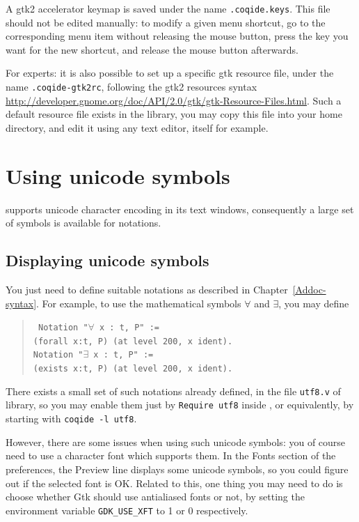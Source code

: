 A gtk2 accelerator keymap is saved under the name \verb|.coqide.keys|.
This file should not be edited manually: to modify a given menu
shortcut, go to the corresponding menu item without releasing the
mouse button, press the key you want for the new shortcut, and release
the mouse button afterwards.

For experts: it is also possible to set up a specific gtk resource
file, under the name \verb|.coqide-gtk2rc|, following the gtk2
resources syntax
\url{http://developer.gnome.org/doc/API/2.0/gtk/gtk-Resource-Files.html}.
Such a default resource file exists in the \Coq{} library, you may
copy this file into your home directory, and edit it using any text
editor, \CoqIDE{} itself for example.

\section{Using unicode symbols}

\CoqIDE{} supports unicode character encoding in its text windows,
consequently a large set of symbols is available for notations.

\subsection{Displaying unicode symbols}

You just need to define suitable notations as described in
Chapter~\ref{Addoc-syntax}. For example, to use the mathematical symbols
$\forall$ and $\exists$, you may define 
\begin{quote}\tt
Notation "$\forall$ x : t, P" := \\
\qquad  (forall x:t, P) (at level 200, x ident).\\
Notation "$\exists$ x : t, P" := \\
\qquad  (exists x:t, P) (at level 200, x ident).
\end{quote}
There exists a small set of such notations already defined, in the
file \verb|utf8.v| of \Coq{} library, so you may enable them just by 
\verb|Require utf8| inside \CoqIDE{}, or equivalently, by starting
\CoqIDE{} with \verb|coqide -l utf8|.

However, there are some issues when using such unicode symbols: you of
course need to use a character font which supports them. In the Fonts
section of the preferences, the Preview line displays some unicode symbols, so
you could figure out if the selected font is OK. Related to this, one
thing you may need to do is choose whether Gtk should use antialiased
fonts or not, by setting the environment variable \verb|GDK_USE_XFT|
to 1 or 0 respectively.

